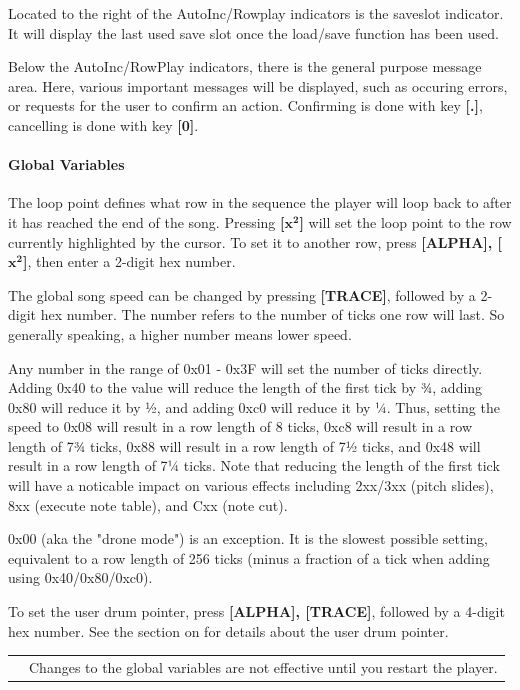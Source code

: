 \documentclass[12pt]{report}	%
\newcommand*{\TakeFourierOrnament}[1]{{%
\fontencoding{U}\fontfamily{futs}\selectfont\char#1}}
\newcommand*{\danger}{\TakeFourierOrnament{66}}
\begin{document}
Located to the right of the AutoInc/Rowplay indicators is the saveslot indicator. It will display the last used save slot once the load/save function has been used.

Below the AutoInc/RowPlay indicators, there is the general purpose message area. Here, various important messages will be displayed, such as occuring errors, or requests for the user to confirm an action. Confirming is done with key \textbf{[.]}, cancelling is done with key \textbf{[0]}. 

\paragraph{Global Variables}\label{sec:globalvars} The loop point defines what row in the sequence the player will loop back to after it has reached the end of the song. Pressing \textbf{[$\bm{x^2}$]} will set the loop point to the row currently highlighted by the cursor. To set it to another row, press \textbf{[ALPHA], [$\bm{x^2}$]}, then enter a 2-digit hex number.

The global song speed can be changed by pressing \textbf{[TRACE]}, followed by a 2-digit hex number. The number refers to the number of ticks one row will last. So generally speaking, a higher number means lower speed.

Any number in the range of 0x01 - 0x3F will set the number of ticks directly. Adding 0x40 to the value will reduce the length of the first tick by ¾, adding 0x80 will reduce it by ½, and adding 0xc0 will reduce it by ¼. Thus, setting the speed to 0x08 will result in a row length of 8 ticks, 0xc8 will result in a row length of 7¾ ticks, 0x88 will result in a row length of 7½ ticks, and 0x48 will result in a row length of 7¼ ticks. Note that reducing the length of the first tick will have a noticable impact on various effects including 2xx/3xx (pitch slides), 8xx (execute note table), and Cxx (note cut).

0x00 (aka the "drone mode") is an exception. It is the slowest possible setting, equivalent to a row length of 256 ticks (minus a fraction of a tick when adding using 0x40/0x80/0xc0).

To set the user drum pointer, press \textbf{[ALPHA], [TRACE]}, followed by a 4-digit hex number. See the section on  for details about the user drum pointer. \newline

\begin{tabularx}{\textwidth}{m{} X}
{\textcolor{red}{\newline\Huge\danger}} & Changes to the global variables are not effective until you restart the player. \\
\end{tabularx} ~\\
\end{document}
